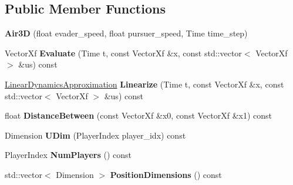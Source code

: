 \subsection*{Public Member Functions}
\begin{DoxyCompactItemize}
\item 
{\bfseries Air3D} (float evader\+\_\+speed, float pursuer\+\_\+speed, Time time\+\_\+step)\hypertarget{classilqgames_1_1_air3_d_a1f8cd7e6aa89f357090b9a8e145400f7}{}\label{classilqgames_1_1_air3_d_a1f8cd7e6aa89f357090b9a8e145400f7}

\item 
Vector\+Xf {\bfseries Evaluate} (Time t, const Vector\+Xf \&x, const std\+::vector$<$ Vector\+Xf $>$ \&us) const \hypertarget{classilqgames_1_1_air3_d_a67aa22b5b20462f3d080fe879ad44758}{}\label{classilqgames_1_1_air3_d_a67aa22b5b20462f3d080fe879ad44758}

\item 
\hyperlink{structilqgames_1_1_linear_dynamics_approximation}{Linear\+Dynamics\+Approximation} {\bfseries Linearize} (Time t, const Vector\+Xf \&x, const std\+::vector$<$ Vector\+Xf $>$ \&us) const \hypertarget{classilqgames_1_1_air3_d_a8071e95d88f670e33e2e17a8a6d7e502}{}\label{classilqgames_1_1_air3_d_a8071e95d88f670e33e2e17a8a6d7e502}

\item 
float {\bfseries Distance\+Between} (const Vector\+Xf \&x0, const Vector\+Xf \&x1) const \hypertarget{classilqgames_1_1_air3_d_ae3831b42e3a97a71abea9d7b8b86b7c7}{}\label{classilqgames_1_1_air3_d_ae3831b42e3a97a71abea9d7b8b86b7c7}

\item 
Dimension {\bfseries U\+Dim} (Player\+Index player\+\_\+idx) const \hypertarget{classilqgames_1_1_air3_d_a1c339bd8572547a07e7928093fcb477a}{}\label{classilqgames_1_1_air3_d_a1c339bd8572547a07e7928093fcb477a}

\item 
Player\+Index {\bfseries Num\+Players} () const \hypertarget{classilqgames_1_1_air3_d_aa469f3a9aebb8d3fc48993d36fd168db}{}\label{classilqgames_1_1_air3_d_aa469f3a9aebb8d3fc48993d36fd168db}

\item 
std\+::vector$<$ Dimension $>$ {\bfseries Position\+Dimensions} () const \hypertarget{classilqgames_1_1_air3_d_a1ae92cabe2edef86bf3e9408716697cf}{}\label{classilqgames_1_1_air3_d_a1ae92cabe2edef86bf3e9408716697cf}

\end{DoxyCompactItemize}

